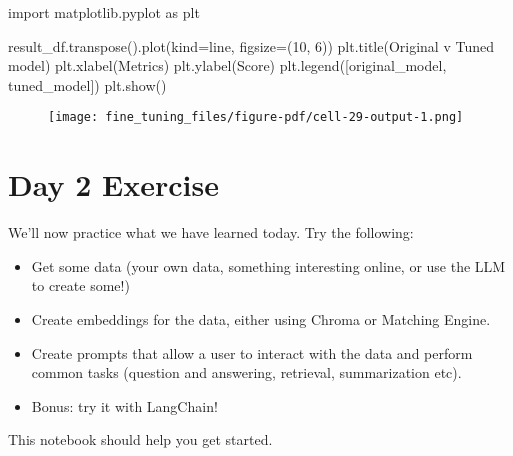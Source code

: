 \documentclass[
  letterpaper,
  DIV=11,
  numbers=noendperiod]{scrreprt}
\newenvironment{Shaded}{\begin{snugshade}}{\end{snugshade}}
\newcommand{\DecValTok}[1]{\textcolor[rgb]{0.68,0.00,0.00}{#1}}
\newcommand{\ImportTok}[1]{\textcolor[rgb]{0.00,0.46,0.62}{#1}}
\newcommand{\NormalTok}[1]{\textcolor[rgb]{0.00,0.23,0.31}{#1}}
\newcommand{\OperatorTok}[1]{\textcolor[rgb]{0.37,0.37,0.37}{#1}}
\newcommand{\StringTok}[1]{\textcolor[rgb]{0.13,0.47,0.30}{#1}}
\begin{document}
\begin{Shaded}
\begin{Highlighting}[]
\ImportTok{import}\NormalTok{ matplotlib.pyplot }\ImportTok{as}\NormalTok{ plt}

\NormalTok{result\_df.transpose().plot(kind}\OperatorTok{=}\StringTok{\textquotesingle{}line\textquotesingle{}}\NormalTok{, figsize}\OperatorTok{=}\NormalTok{(}\DecValTok{10}\NormalTok{, }\DecValTok{6}\NormalTok{))}
\NormalTok{plt.title(}\StringTok{\textquotesingle{}Original v Tuned model\textquotesingle{}}\NormalTok{)}
\NormalTok{plt.xlabel(}\StringTok{\textquotesingle{}Metrics\textquotesingle{}}\NormalTok{)}
\NormalTok{plt.ylabel(}\StringTok{\textquotesingle{}Score\textquotesingle{}}\NormalTok{)}
\NormalTok{plt.legend([}\StringTok{\textquotesingle{}original\_model\textquotesingle{}}\NormalTok{, }\StringTok{\textquotesingle{}tuned\_model\textquotesingle{}}\NormalTok{])}
\NormalTok{plt.show()}
\end{Highlighting}
\end{Shaded}

\begin{figure}[H]

{\centering \texttt{[image: fine\_tuning\_files/figure-pdf/cell-29-output-1.png]}

}

\end{figure}

\hypertarget{day-2-exercise}{%
\chapter{Day 2 Exercise}\label{day-2-exercise}}

We'll now practice what we have learned today. Try the following:

\begin{itemize}
\item
  Get some data (your own data, something interesting online, or use the
  LLM to create some!)
\item
  Create embeddings for the data, either using Chroma or Matching
  Engine.
\item
  Create prompts that allow a user to interact with the data and perform
  common tasks (question and answering, retrieval, summarization etc).
\item
  Bonus: try it with LangChain!
\end{itemize}

This notebook should help you get started.
\end{document}
